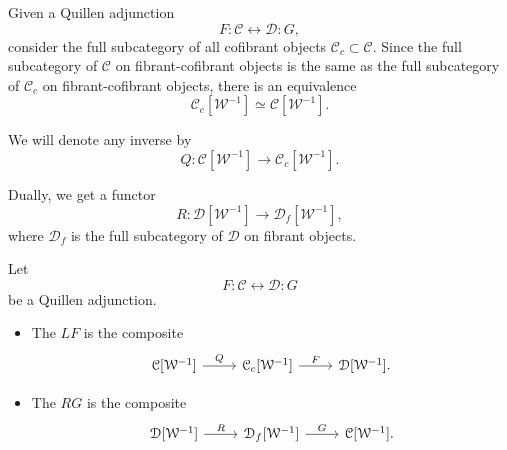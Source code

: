 \documentclass[main.tex]{subfiles}
\begin{document}
Given a Quillen adjunction
\begin{equation*}
  F : \mathcal{C} \leftrightarrow \mathcal{D} : G,
\end{equation*}
consider the full subcategory of all cofibrant objects $\mathcal{C}_{c} \subset \mathcal{C}$. Since the full subcategory of $\mathcal{C}$ on fibrant-cofibrant objects is the same as the full subcategory of $\mathcal{C}_{c}$ on fibrant-cofibrant objects, there is an equivalence
\begin{equation*}
  \mathcal{C}_{c}[\mathcal{W}^{-1}] \simeq \mathcal{C}[\mathcal{W}^{-1}].
\end{equation*}

We will denote any inverse by
\begin{equation*}
  Q\colon \mathcal{C}[\mathcal{W}^{-1}] \to \mathcal{C}_{c}[\mathcal{W}^{-1}].
\end{equation*}

Dually, we get a functor
\begin{equation*}
  R\colon \mathcal{D}[\mathcal{W}^{-1}] \to \mathcal{D}_{f}[\mathcal{W}^{-1}],
\end{equation*}
where $\mathcal{D}_{f}$ is the full subcategory of $\mathcal{D}$ on fibrant objects.

\begin{definition}
  \label{def:left_derived_functor}
  Let
  \begin{equation*}
    F : \mathcal{C} \leftrightarrow \mathcal{D} : G
  \end{equation*}
  be a Quillen adjunction.
  \begin{itemize}
    \item The  $LF$ is the composite
      \begin{equation*}
        \begin{tikzcd}
          \mathcal{C}[\mathcal{W}^{-1}]
          \arrow[r, "Q"]
          & \mathcal{C}_{c}[\mathcal{W}^{-1}]
          \arrow[r, "F"]
          & \mathcal{D}[\mathcal{W}^{-1}].
        \end{tikzcd}
      \end{equation*}

    \item The  $RG$ is the composite
      \begin{equation*}
        \begin{tikzcd}
          \mathcal{D}[\mathcal{W}^{-1}]
          \arrow[r, "R"]
          & \mathcal{D}_{f}[\mathcal{W}^{-1}]
          \arrow[r, "G"]
          & \mathcal{C}[\mathcal{W}^{-1}].
        \end{tikzcd}
      \end{equation*}
  \end{itemize} 
\end{definition}
\end{document}
